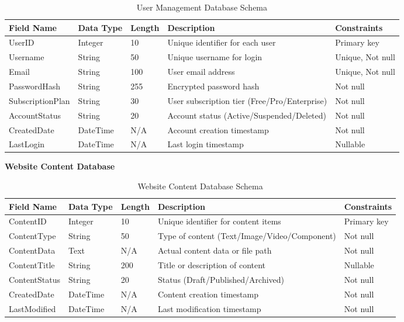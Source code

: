 \documentclass[12pt,a4paper]{article}
\begin{document}
\begin{table}[H]
\centering
\renewcommand{\arraystretch}{1.3}
\begin{tabular}{|p{2.5cm}|p{1.8cm}|p{1.4cm}|p{5cm}|p{2.5cm}|}
\hline
\rowcolor{orange!20}
\textbf{Field Name} & \textbf{Data Type} & \textbf{Length} & \textbf{Description} & \textbf{Constraints} \\
\hline
UserID & Integer & 10 & Unique identifier for each user & Primary key \\
\hline
Username & String & 50 & Unique username for login & Unique, Not null \\
\hline
Email & String & 100 & User email address & Unique, Not null \\
\hline
PasswordHash & String & 255 & Encrypted password hash & Not null \\
\hline
SubscriptionPlan & String & 30 & User subscription tier (Free/Pro/Enterprise) & Not null \\
\hline
AccountStatus & String & 20 & Account status (Active/Suspended/Deleted) & Not null \\
\hline
CreatedDate & DateTime & N/A & Account creation timestamp & Not null \\
\hline
LastLogin & DateTime & N/A & Last login timestamp & Nullable \\
\hline
\end{tabular}
\caption{User Management Database Schema}
\end{table}

{\color{orange!80}\large\textbf{Website Content Database}}

\begin{table}[H]
\centering
\renewcommand{\arraystretch}{1.3}
\begin{tabular}{|p{2.5cm}|p{1.8cm}|p{1.4cm}|p{5cm}|p{2.5cm}|}
\hline
\rowcolor{orange!20}
\textbf{Field Name} & \textbf{Data Type} & \textbf{Length} & \textbf{Description} & \textbf{Constraints} \\
\hline
ContentID & Integer & 10 & Unique identifier for content items & Primary key \\
\hline
ContentType & String & 50 & Type of content (Text/Image/Video/Component) & Not null \\
\hline
ContentData & Text & N/A & Actual content data or file path & Not null \\
\hline
ContentTitle & String & 200 & Title or description of content & Nullable \\
\hline
ContentStatus & String & 20 & Status (Draft/Published/Archived) & Not null \\
\hline
CreatedDate & DateTime & N/A & Content creation timestamp & Not null \\
\hline
LastModified & DateTime & N/A & Last modification timestamp & Not null \\
\hline
\end{tabular}
\caption{Website Content Database Schema}
\end{table}
\end{document}
